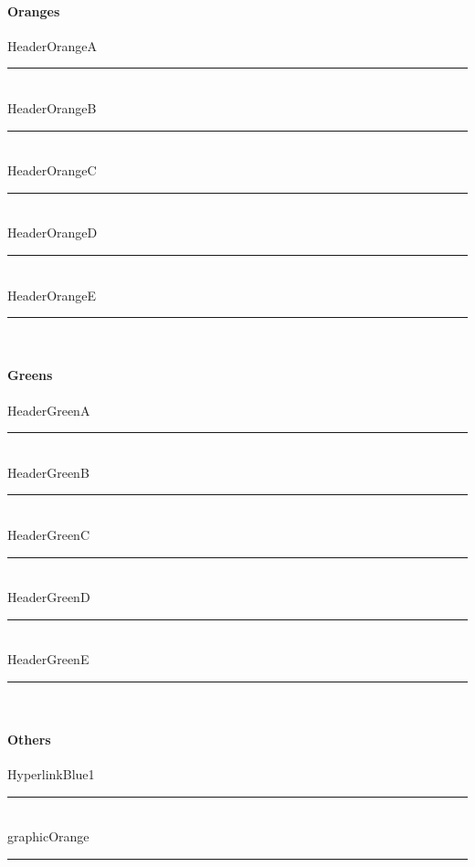 \documentclass[class=book , crop=false]{standalone}
\begin{document}
\paragraph[Oranges]{Oranges\texorpdfstring{\\}{}}
\textcolor{HeaderOrangeA}{HeaderOrangeA}
\noindent\textcolor{HeaderOrangeA}{\rule{.5\textwidth}{.5mm}}\\
\textcolor{HeaderOrangeB}{HeaderOrangeB}
\noindent\textcolor{HeaderOrangeB}{\rule{.5\textwidth}{.5mm}}\\
\textcolor{HeaderOrangeC}{HeaderOrangeC}
\noindent\textcolor{HeaderOrangeC}{\rule{.5\textwidth}{.5mm}}\\
\textcolor{HeaderOrangeD}{HeaderOrangeD}
\noindent\textcolor{HeaderOrangeD}{\rule{.5\textwidth}{.5mm}}\\
\textcolor{HeaderOrangeE}{HeaderOrangeE}
\noindent\textcolor{HeaderOrangeE}{\rule{.5\textwidth}{.5mm}}\\
%
\paragraph[Geens]{Greens\texorpdfstring{\\}{}}
\textcolor{HeaderGreenA}{HeaderGreenA}
\noindent\textcolor{HeaderGreenA}{\rule{.5\textwidth}{.5mm}}\\
\textcolor{HeaderGreenB}{HeaderGreenB}
\noindent\textcolor{HeaderGreenB}{\rule{.5\textwidth}{.5mm}}\\
\textcolor{HeaderGreenC}{HeaderGreenC}
\noindent\textcolor{HeaderGreenC}{\rule{.5\textwidth}{.5mm}}\\
\textcolor{HeaderGreenD}{HeaderGreenD}
\noindent\textcolor{HeaderGreenD}{\rule{.5\textwidth}{.5mm}}\\
\textcolor{HeaderGreenE}{HeaderGreenE}
\noindent\textcolor{HeaderGreenE}{\rule{.5\textwidth}{.5mm}}\\
%
\paragraph[Others]{Others\texorpdfstring{\\}{}}
\textcolor{HyperlinkBlue1}{HyperlinkBlue1}
\noindent\textcolor{HyperlinkBlue1}{\rule{.5\textwidth}{.5mm}}\\
\textcolor{graphicOrange}{graphicOrange}
\noindent\textcolor{graphicOrange}{\rule{.5\textwidth}{.5mm}}\\
\clearpage
\end{document}
